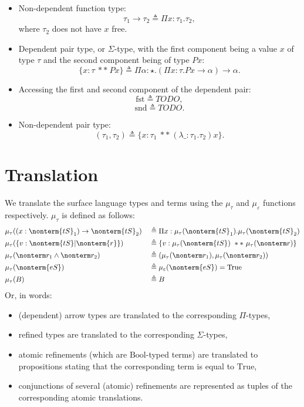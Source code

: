 \documentclass[a4paper]{article}
\begin{document}
\begin{itemize}
  \item Non-dependent function type:
  \[
    \tau_1 \rightarrow \tau_2 \triangleq \Pi x : \tau_1. \tau_2,
  \]
  where $\tau_2$ does not have $x$ free.
  \item Dependent pair type, or $\Sigma$-type, with the first component being a value $x$ of type $\tau$ and the second component being of type $P x$:
  \[
    \{ x : \tau\ **\ P x \} \triangleq \Pi \alpha : \star. (\Pi x : \tau. P x \rightarrow \alpha) \rightarrow \alpha.
  \]
  \item Accessing the first and second component of the dependent pair:
  \[
    \text{fst} \triangleq TODO,
  \]
  \[
    \text{snd} \triangleq TODO.
  \]
  \item Non-dependent pair type:
  \[
    (\tau_1, \tau_2) \triangleq \{ x : \tau_1\ **\ (\lambda \_ : \tau_1. \tau_2) x \}.
  \]
\end{itemize}

\section{Translation}

We translate the surface language types and terms using the $\mu_\tau$ and $\mu_\varepsilon$ functions respectively.
$\mu_\tau$ is defined as follows:
\begin{equation}
\begin{aligned}
  & \mu_\tau( (x : \nonterm{tS}_1) \rightarrow \nonterm{tS}_2)  && \triangleq \Pi x : \mu_\tau(\nonterm{tS}_1). \mu_\tau(\nonterm{tS}_2)  \\
  & \mu_\tau( \{ v : \nonterm{tS} | \nonterm{r} \})             && \triangleq \{ v : \mu_\tau(\nonterm{tS})\ **\ \mu_\tau(\nonterm r) \}  \\
  & \mu_\tau( \nonterm r_1 \land \nonterm r_2 )                 && \triangleq ( \mu_\tau(\nonterm r_1) , \mu_\tau(\nonterm r_2))          \\
  & \mu_\tau( \nonterm{eS} )                                    && \triangleq \mu_\varepsilon(\nonterm{eS}) = \text{True}                 \\
  & \mu_\tau(B)                                                 && \triangleq B                                                           \\
\end{aligned}
\end{equation}
Or, in words:
\begin{itemize}
  \item (dependent) arrow types are translated to the corresponding $\Pi$-types,
  \item refined types are translated to the corresponding $\Sigma$-types,
  \item atomic refinements (which are $\text{Bool}$-typed terms) are translated to propositions stating that the corresponding term is equal to $\text{True}$,
  \item conjunctions of several (atomic) refinements are represented as tuples of the corresponding atomic translations.
\end{itemize}
\end{document}
